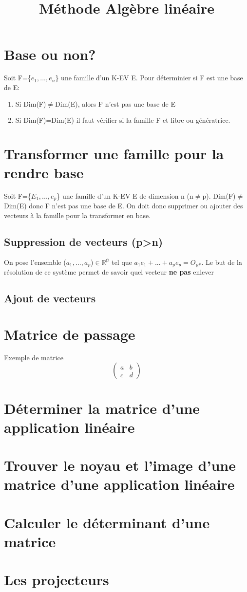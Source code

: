 \documentclass{article}
\author{}
\date{}
\title{Méthode Algèbre linéaire}
\begin{document}
\maketitle
\section{Base ou non?}
Soit F=\{$e_{1},...,e_{n}$\} une famille d'un K-EV E. Pour déterminier si F est une base de E:
\begin{enumerate}
    \item Si Dim(F)$\neq$Dim(E), alors F n'est pas une base de E
    \item Si Dim(F)=Dim(E) il faut vérifier si la famille F et libre ou génératrice.
\end{enumerate}
\section{Transformer une famille pour la rendre base}
Soit F=\{$E_{1},...,e_{p}$\} une famille d'un K-EV E de dimension n (n$\neq$p). Dim(F)$\neq$Dim(E) donc F n'est pas une base de E. On doit donc supprimer ou ajouter des vecteurs à la famille pour la transformer en base.\newline
\subsection{Suppression de vecteurs (p>n)}
On pose l'ensemble ($a_{1},...,a_{p}$)$\in \mathbb{R^{p}}$ tel que $a_{1}e_{1}+...+a_{p}e_{p} = O_{\mathbb{R^{p}}}$. Le but de la résolution de ce système permet de savoir quel vecteur \textbf{ne pas} enlever
\subsection{Ajout de vecteurs}

\section{Matrice de passage}
Exemple de matrice
$$\left(
    \begin{array}{cc}
    a & b \\
    c & d 
    \end{array} 
  \right)$$
\section{Déterminer la matrice d'une application linéaire}
\section{Trouver le noyau et l'image d'une matrice d'une application linéaire}
\section{Calculer le déterminant d'une matrice}
\section{Les projecteurs}
\end{document}
